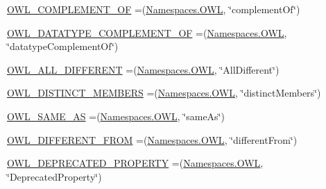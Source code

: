 \begin{DoxyCompactItemize}
\item 
\hyperlink{enumorg_1_1semanticweb_1_1owlapi_1_1vocab_1_1_o_w_l_r_d_f_vocabulary_aa4e80c0101ed4d6e06ef56bd234298b6}{O\-W\-L\-\_\-\-C\-O\-M\-P\-L\-E\-M\-E\-N\-T\-\_\-\-O\-F} =(\hyperlink{enumorg_1_1semanticweb_1_1owlapi_1_1vocab_1_1_namespaces_a2fcb537074d9307ef1356ffb6a5bd6f4}{Namespaces.\-O\-W\-L}, \char`\"{}complement\-Of\char`\"{})
\item 
\hyperlink{enumorg_1_1semanticweb_1_1owlapi_1_1vocab_1_1_o_w_l_r_d_f_vocabulary_af4a726bba33e06a99e24416f6200a9b6}{O\-W\-L\-\_\-\-D\-A\-T\-A\-T\-Y\-P\-E\-\_\-\-C\-O\-M\-P\-L\-E\-M\-E\-N\-T\-\_\-\-O\-F} =(\hyperlink{enumorg_1_1semanticweb_1_1owlapi_1_1vocab_1_1_namespaces_a2fcb537074d9307ef1356ffb6a5bd6f4}{Namespaces.\-O\-W\-L}, \char`\"{}datatype\-Complement\-Of\char`\"{})
\item 
\hyperlink{enumorg_1_1semanticweb_1_1owlapi_1_1vocab_1_1_o_w_l_r_d_f_vocabulary_a3cd0ba9cafeaf8c86b778878bfee817b}{O\-W\-L\-\_\-\-A\-L\-L\-\_\-\-D\-I\-F\-F\-E\-R\-E\-N\-T} =(\hyperlink{enumorg_1_1semanticweb_1_1owlapi_1_1vocab_1_1_namespaces_a2fcb537074d9307ef1356ffb6a5bd6f4}{Namespaces.\-O\-W\-L}, \char`\"{}All\-Different\char`\"{})
\item 
\hyperlink{enumorg_1_1semanticweb_1_1owlapi_1_1vocab_1_1_o_w_l_r_d_f_vocabulary_a4ba41100cc8dcf4b41a88b908a3e9656}{O\-W\-L\-\_\-\-D\-I\-S\-T\-I\-N\-C\-T\-\_\-\-M\-E\-M\-B\-E\-R\-S} =(\hyperlink{enumorg_1_1semanticweb_1_1owlapi_1_1vocab_1_1_namespaces_a2fcb537074d9307ef1356ffb6a5bd6f4}{Namespaces.\-O\-W\-L}, \char`\"{}distinct\-Members\char`\"{})
\item 
\hyperlink{enumorg_1_1semanticweb_1_1owlapi_1_1vocab_1_1_o_w_l_r_d_f_vocabulary_a3dc3dbd93c259dd68b5f03f6d245b1cd}{O\-W\-L\-\_\-\-S\-A\-M\-E\-\_\-\-A\-S} =(\hyperlink{enumorg_1_1semanticweb_1_1owlapi_1_1vocab_1_1_namespaces_a2fcb537074d9307ef1356ffb6a5bd6f4}{Namespaces.\-O\-W\-L}, \char`\"{}same\-As\char`\"{})
\item 
\hyperlink{enumorg_1_1semanticweb_1_1owlapi_1_1vocab_1_1_o_w_l_r_d_f_vocabulary_a075f157d3e3d3e5231a135e771bc8109}{O\-W\-L\-\_\-\-D\-I\-F\-F\-E\-R\-E\-N\-T\-\_\-\-F\-R\-O\-M} =(\hyperlink{enumorg_1_1semanticweb_1_1owlapi_1_1vocab_1_1_namespaces_a2fcb537074d9307ef1356ffb6a5bd6f4}{Namespaces.\-O\-W\-L}, \char`\"{}different\-From\char`\"{})
\item 
\hyperlink{enumorg_1_1semanticweb_1_1owlapi_1_1vocab_1_1_o_w_l_r_d_f_vocabulary_a362677fdd57c678da59a19988a8f7bf0}{O\-W\-L\-\_\-\-D\-E\-P\-R\-E\-C\-A\-T\-E\-D\-\_\-\-P\-R\-O\-P\-E\-R\-T\-Y} =(\hyperlink{enumorg_1_1semanticweb_1_1owlapi_1_1vocab_1_1_namespaces_a2fcb537074d9307ef1356ffb6a5bd6f4}{Namespaces.\-O\-W\-L}, \char`\"{}Deprecated\-Property\char`\"{})

\end{DoxyCompactItemize}
